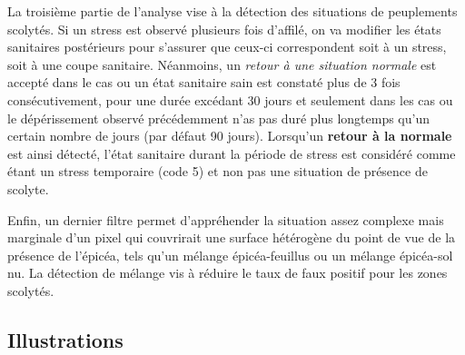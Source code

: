 \documentclass[a4paper, 12pt]{article} %
\begin{document}
La troisième partie de l'analyse vise à la détection des situations de peuplements scolytés. Si un stress est observé plusieurs fois d'affilé, on va modifier les états sanitaires postérieurs pour s'assurer que ceux-ci correspondent soit à un stress, soit à une coupe sanitaire. Néanmoins, un \textit{retour à une situation normale} est accepté dans le cas ou un état sanitaire sain est constaté plus de 3 fois consécutivement, pour une durée excédant 30 jours et seulement dans les cas ou le dépérissement observé précédemment n'as pas duré plus longtemps qu'un certain nombre de jours (par défaut 90 jours). Lorsqu'un \textbf{retour à la normale} est ainsi détecté, l'état sanitaire durant la période de stress est considéré comme étant un stress temporaire (code 5) et non pas une situation de présence de scolyte.

Enfin, un dernier filtre permet d'appréhender la situation assez complexe mais marginale d'un pixel qui couvrirait une surface hétérogène du point de vue de la présence de l'épicéa, tels qu'un mélange épicéa-feuillus ou un mélange épicéa-sol nu. La détection de mélange vis à réduire le taux de faux positif pour les zones scolytés.

\subsection{Illustrations}
\end{document}
